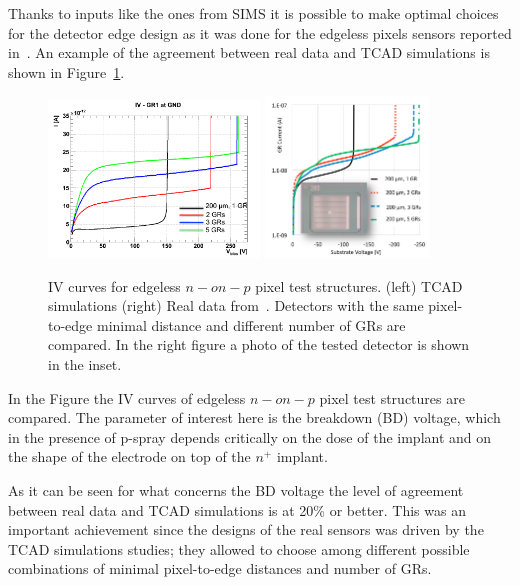 Thanks to inputs like the ones from SIMS it is possible to make optimal choices for the detector 
edge design as it was done for the edgeless pixels sensors reported in~\cite{bib:nim2012}. 
An example of the agreement between real data and TCAD simulations is shown in 
Figure~\ref{fig:IV_BD}.
\begin{figure}[!htbp]
\centering
\includegraphics[width=0.5\textwidth]{IV_simulations}
\includegraphics[width=0.39\textwidth]{newIV_data.pdf}
\caption{\label{fig:IV_BD}IV curves for edgeless $n-on-p$ pixel test structures. (left) TCAD simulations 
(right) Real data from~\cite{bib:nim2012}. Detectors with the same pixel-to-edge minimal distance 
and different number of GRs are compared. In the right figure a photo of the tested detector is 
shown in the inset.}
\end{figure}
In the Figure the IV curves of edgeless $n-on-p$ pixel test structures are compared. The 
parameter of interest here is the breakdown (BD) voltage, which in the presence of 
p-spray depends critically on the dose of the implant and on the shape of the electrode 
on top of the $n^+$ implant. 

As it can be seen for what concerns the BD voltage the level of agreement between real data 
and TCAD simulations is at 20\% or better. This was an important achievement since 
the designs of the real sensors was driven by the TCAD simulations studies; they allowed 
to choose among different possible combinations of minimal pixel-to-edge distances and 
number of GRs. 

